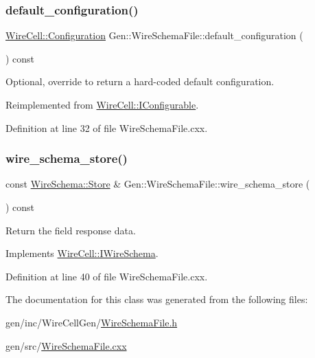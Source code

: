 \subsubsection{\texorpdfstring{default\+\_\+configuration()}{default\_configuration()}}
{\footnotesize\ttfamily \hyperlink{namespace_wire_cell_a9f705541fc1d46c608b3d32c182333ee}{Wire\+Cell\+::\+Configuration} Gen\+::\+Wire\+Schema\+File\+::default\+\_\+configuration (\begin{DoxyParamCaption}{ }\end{DoxyParamCaption}) const\hspace{0.3cm}{\ttfamily [virtual]}}



Optional, override to return a hard-\/coded default configuration. 



Reimplemented from \hyperlink{class_wire_cell_1_1_i_configurable_a54841b2da3d1ea02189478bff96f7998}{Wire\+Cell\+::\+I\+Configurable}.



Definition at line 32 of file Wire\+Schema\+File.\+cxx.

\mbox{\label{class_wire_cell_1_1_gen_1_1_wire_schema_file_a127d3bf1f678722d248cce569141a69e}} 
\subsubsection{\texorpdfstring{wire\+\_\+schema\+\_\+store()}{wire\_schema\_store()}}
{\footnotesize\ttfamily const \hyperlink{class_wire_cell_1_1_wire_schema_1_1_store}{Wire\+Schema\+::\+Store} \& Gen\+::\+Wire\+Schema\+File\+::wire\+\_\+schema\+\_\+store (\begin{DoxyParamCaption}{ }\end{DoxyParamCaption}) const\hspace{0.3cm}{\ttfamily [virtual]}}



Return the field response data. 



Implements \hyperlink{class_wire_cell_1_1_i_wire_schema_a054538cf0ab8dbfd7b5d2a0064304c08}{Wire\+Cell\+::\+I\+Wire\+Schema}.



Definition at line 40 of file Wire\+Schema\+File.\+cxx.



The documentation for this class was generated from the following files\+:\begin{DoxyCompactItemize}
\item 
gen/inc/\+Wire\+Cell\+Gen/\hyperlink{_wire_schema_file_8h}{Wire\+Schema\+File.\+h}\item 
gen/src/\hyperlink{_wire_schema_file_8cxx}{Wire\+Schema\+File.\+cxx}\end{DoxyCompactItemize}
